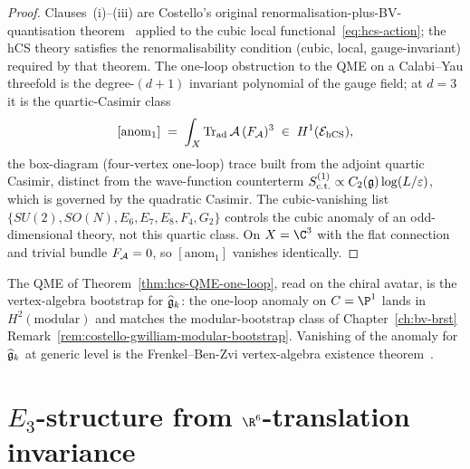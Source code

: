 \begin{proof}
Clauses~(i)--(iii) are Costello's original
renormalisation-plus-BV-quantisation
theorem~\cite[Ch.\,5,\,Thm.\,A]{CostelloRenormalization} applied to the
cubic local functional~\eqref{eq:hcs-action}; the hCS theory
satisfies the renormalisability condition (cubic, local,
gauge-invariant) required by that theorem. The one-loop obstruction to
the QME on a Calabi--Yau threefold is the degree-$(d+1)$ invariant
polynomial of the gauge field; at $d = 3$ it is the quartic-Casimir
class
\begin{equation}
\label{eq:hcs-quartic-anomaly}
 [\mathrm{anom}_1]
 \;=\; \int_X \mathrm{Tr}_{\mathrm{ad}}\,\mathcal{A}\,(F_{\mathcal{A}})^3
 \;\in\; H^1(\mathcal{E}_{\mathrm{hCS}}),
\end{equation}
the box-diagram (four-vertex one-loop) trace built from the adjoint
quartic Casimir, distinct from the wave-function counterterm
$S^{(1)}_{\mathrm{c.t.}}\propto C_2(\mathfrak{g})\log(L/\varepsilon)$, which is
governed by the quadratic Casimir. The cubic-vanishing list
$\{SU(2),SO(N),E_6,E_7,E_8,F_4,G_2\}$ controls the cubic anomaly of an
odd-dimensional theory, not this quartic class. On $X = \C^3$ with the
flat connection and trivial bundle $F_{\mathcal{A}} = 0$, so
$[\mathrm{anom}_1]$ vanishes identically.
\end{proof}

\begin{remark}
\label{rem:qme-chiral-avatar}
The QME of Theorem~\ref{thm:hcs-QME-one-loop}, read on the
chiral avatar, is the vertex-algebra bootstrap for $\widehat{\mathfrak{g}}_k$: the
one-loop anomaly on $C = \P^1$ lands in $H^2(\mathrm{modular})$ and
matches the modular-bootstrap class of
Chapter~\ref{ch:bv-brst}
Remark~\ref{rem:costello-gwilliam-modular-bootstrap}. Vanishing of
the anomaly for $\widehat{\mathfrak{g}}_k$ at generic level is the
Frenkel--Ben-Zvi vertex-algebra existence
theorem~\cite{FrenkelBenZvi2004}.
\end{remark}

\section{$E_3$-structure from $\R^6$-translation invariance}
\label{sec:hcs-e3}

